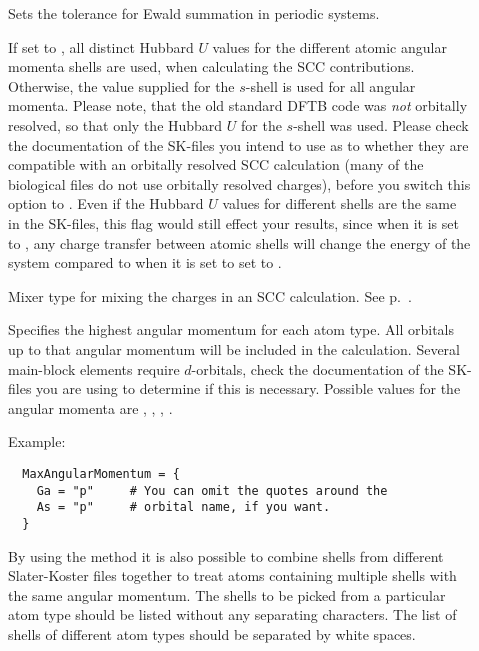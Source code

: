 \begin{description}
\item[] Sets the tolerance for Ewald summation in periodic
  systems.

\item[] If set to , all distinct
  Hubbard $U$ values for the different atomic angular momenta shells
  are used, when calculating the SCC contributions. Otherwise, the
  value supplied for the $s$-shell is used for all angular
  momenta. Please note, that the old standard DFTB code was \emph{not}
  orbitally resolved, so that only the Hubbard $U$ for the $s$-shell
  was used. Please check the documentation of the SK-files you intend
  to use as to whether they are compatible with an orbitally resolved
  SCC calculation (many of the biological files do not use orbitally
  resolved charges), before you switch this option to . Even
  if the Hubbard $U$ values for different shells are the same in the
  SK-files, this flag would still effect your results, since when it
  is set to , any charge transfer between atomic shells will
  change the energy of the system compared to when it is set to set to
  .

\item[]  Mixer type for mixing the charges in an SCC
  calculation. See p.~.

\item[] Specifies the highest angular momentum
  for each atom type. All orbitals up to that angular momentum will be
  included in the calculation. Several main-block elements require
  $d$-orbitals, check the documentation of the SK-files you are using
  to determine if this is necessary. Possible values for the angular
  momenta are , , , .

  Example:
\begin{verbatim}
  MaxAngularMomentum = {
    Ga = "p"     # You can omit the quotes around the
    As = "p"     # orbital name, if you want.
  }
\end{verbatim}

  By using the  method it is also possible to
  combine shells from different Slater-Koster files together to treat
  atoms containing multiple shells with the same angular momentum. The
  shells to be picked from a particular atom type should be listed
  without any separating characters.  The list of shells of different
  atom types should be separated by white spaces.


\end{description}
